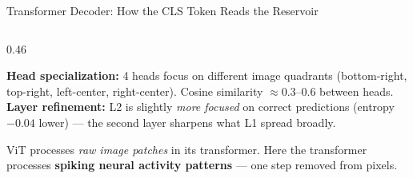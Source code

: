 \documentclass[aspectratio=169,11pt]{beamer}
\newcommand{\hl}[1]{{\color{highlight}\textbf{#1}}}
\begin{document}
\begin{frame}[shrink=5]{Transformer Decoder: How the CLS Token Reads the Reservoir}
\begin{columns}[T]
\begin{column}{0.46\textwidth}
\begin{tcolorbox}[mybox,title=What does CLS pay attention to?]
    \textbf{Head specialization:} 4 heads focus on different image quadrants
    (bottom-right, top-right, left-center, right-center).
    Cosine similarity $\approx0.3$–0.6 between heads.\\[0.4em]
    \textbf{Layer refinement:} L2 is slightly \emph{more focused} on
    correct predictions (entropy $-0.04$ lower) — the second layer sharpens
    what L1 spread broadly.
  \end{tcolorbox}
  \vspace{0.3em}
  \begin{tcolorbox}[mybox,title=Comparison to ViT]
    \scriptsize
    ViT processes \emph{raw image patches} in its transformer.
    Here the transformer processes \hl{spiking neural activity patterns} —
    one step removed from pixels.
  \end{tcolorbox}
\end{column}
\end{columns}
\end{frame}
\end{document}
